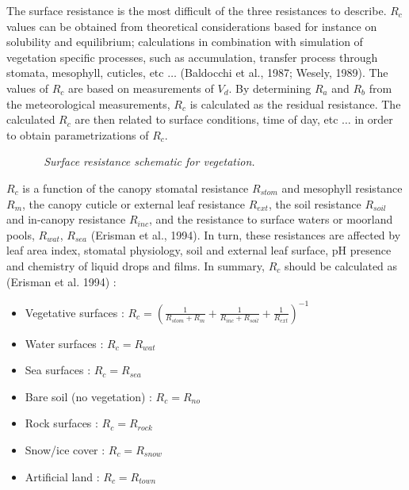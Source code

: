 The surface resistance is the most difficult of the three resistances to
describe. $R_c$ values can be obtained from theoretical considerations based
for instance on solubility and equilibrium; calculations in combination with
simulation of vegetation specific processes, such as accumulation, transfer
process through stomata, mesophyll, cuticles, etc $\ldots$
(Baldocchi et al., 1987; Wesely, 1989). The values of $R_c$ are based on
measurements of $V_d$. By determining $R_a$ and $R_b$ from the meteorological
measurements, $R_c$ is calculated as the residual resistance. The calculated
$R_c$ are then related to surface conditions, time of day, etc $\ldots$ in
order to obtain parametrizations of $R_c$.

\begin{figure}[htb]
\centerline{}
\caption{\sl ~{Surface resistance schematic for vegetation.}}
\label{schema2}
\end{figure}
$R_c$ is a function of the canopy stomatal resistance $R_{stom}$ and mesophyll
resistance $R_m$, the canopy cuticle or external leaf resistance $R_{ext}$, the
soil resistance $R_{soil}$ and in-canopy resistance $R_{inc}$, 
and the resistance
to surface waters or moorland pools, $R_{wat}$, $R_{sea}$ (Erisman et
al., 1994). 
In turn, these resistances are affected by leaf area index, stomatal
physiology, soil and external leaf surface, pH presence and chemistry of
liquid drops and films.
In summary, $R_c$ should be calculated as (Erisman et al. 1994) :
\begin{itemize}
\item Vegetative surfaces :
$
R_c= \left(\frac{1}{R_{stom}+R_m}+\frac{1}{R_{inc}+R_{soil}} + \frac{1}{R_{ext}} \right)^{-1} 
$
\item Water surfaces : $R_c=R_{wat}$
\item Sea surfaces : $R_c=R_{sea}$ 
\item Bare soil (no vegetation) : $R_c=R_{no}$
\item Rock surfaces : $R_c=R_{rock}$
\item Snow/ice  cover : $R_c=R_{snow}$
\item Artificial land : $R_c=R_{town}$

\end{itemize}

